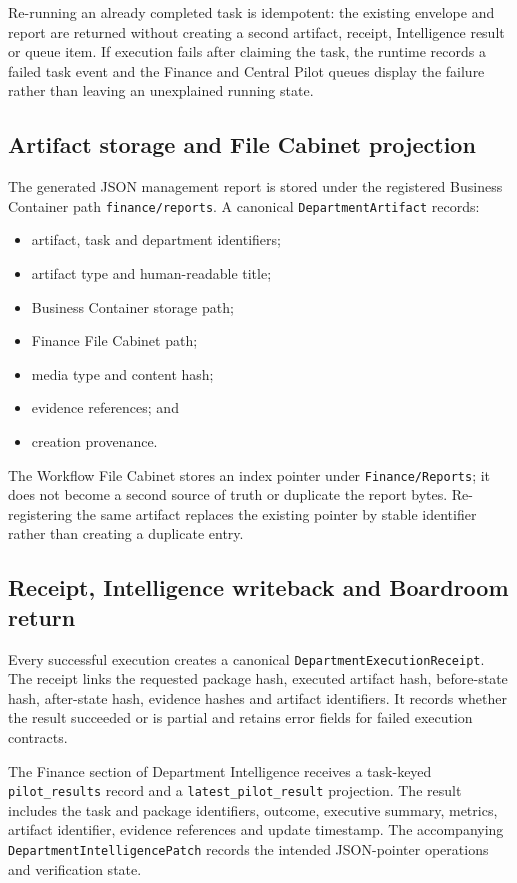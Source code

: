 Re-running an already completed task is idempotent: the existing envelope and report are returned without creating a second artifact, receipt, Intelligence result or queue item.  If execution fails after claiming the task, the runtime records a failed task event and the Finance and Central Pilot queues display the failure rather than leaving an unexplained running state.

\subsection{Artifact storage and File Cabinet projection}

The generated JSON management report is stored under the registered Business Container path \texttt{finance/reports}.  A canonical \texttt{DepartmentArtifact} records:
\begin{itemize}
  \item artifact, task and department identifiers;
  \item artifact type and human-readable title;
  \item Business Container storage path;
  \item Finance File Cabinet path;
  \item media type and content hash;
  \item evidence references; and
  \item creation provenance.
\end{itemize}

The Workflow File Cabinet stores an index pointer under \texttt{Finance/Reports}; it does not become a second source of truth or duplicate the report bytes.  Re-registering the same artifact replaces the existing pointer by stable identifier rather than creating a duplicate entry.

\subsection{Receipt, Intelligence writeback and Boardroom return}

Every successful execution creates a canonical \texttt{DepartmentExecutionReceipt}.  The receipt links the requested package hash, executed artifact hash, before-state hash, after-state hash, evidence hashes and artifact identifiers.  It records whether the result succeeded or is partial and retains error fields for failed execution contracts.

The Finance section of Department Intelligence receives a task-keyed \texttt{pilot\_results} record and a \texttt{latest\_pilot\_result} projection.  The result includes the task and package identifiers, outcome, executive summary, metrics, artifact identifier, evidence references and update timestamp.  The accompanying \texttt{DepartmentIntelligencePatch} records the intended JSON-pointer operations and verification state.

